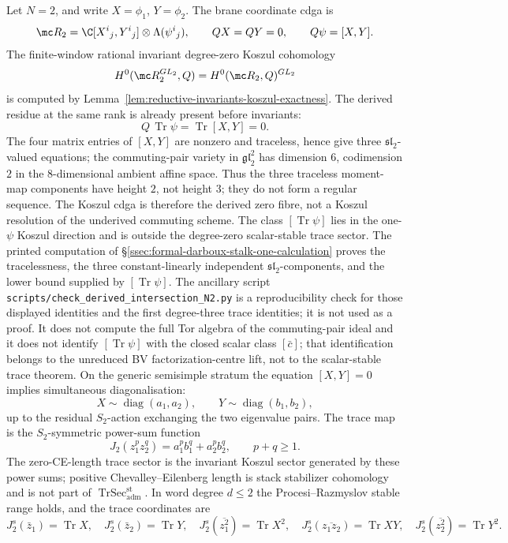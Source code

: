 \documentclass[11pt]{memoir}
\begin{document}
Let \(N=2\), and write \(X=\phi_1\), \(Y=\phi_2\).  The brane
coordinate cdga is
\[
  \mc R_2=
  \C[X^i{}_j,Y^i{}_j]\otimes\Lambda(\psi^i{}_j),
  \qquad
  QX=QY=0,\qquad Q\psi=[X,Y].
\]
The finite-window rational invariant degree-zero Koszul cohomology
\[
  H^0(\mc R_2^{GL_2},Q)
  =
  H^0(\mc R_2,Q)^{GL_2}
\]
is computed by Lemma~\ref{lem:reductive-invariants-koszul-exactness}.
The derived residue at the same rank is already present before
invariants:
\[
  Q\,\operatorname{Tr}\psi=\operatorname{Tr}[X,Y]=0.
\]
The four matrix entries of \([X,Y]\) are nonzero and traceless, hence
give three \(\mathfrak{sl}_2\)-valued equations; the commuting-pair
variety in \(\mathfrak{gl}_2^2\) has dimension \(6\), codimension
\(2\) in the \(8\)-dimensional ambient affine space.  Thus the three
traceless moment-map components have height \(2\), not height \(3\);
they do not form a regular sequence.  The Koszul cdga is therefore the
derived zero fibre, not a Koszul resolution of the underived commuting
scheme.  The class \([\operatorname{Tr}\psi]\) lies in the
one-\(\psi\) Koszul direction and is outside the degree-zero
scalar-stable trace sector.  The printed computation of
\S\ref{ssec:formal-darboux-stalk-one-calculation} proves the
tracelessness, the three constant-linearly independent
\(\mathfrak{sl}_2\)-components, and the lower bound supplied by
\([\operatorname{Tr}\psi]\).  The ancillary script
\texttt{scripts/check\_derived\_intersection\_N2.py} is a
reproducibility check for those displayed identities and the first
degree-three trace identities; it is not used as a proof.  It does not
compute the full Tor algebra of the commuting-pair ideal and it does not
identify \([\operatorname{Tr}\psi]\) with the closed scalar class
\([\bar c]\); that identification belongs to the unreduced BV
factorization-centre lift, not to the scalar-stable trace theorem.
On the generic semisimple stratum the equation \([X,Y]=0\) implies
simultaneous diagonalisation:
\[
  X\sim\operatorname{diag}(a_1,a_2),\qquad
  Y\sim\operatorname{diag}(b_1,b_2),
\]
up to the residual \(S_2\)-action exchanging the two eigenvalue pairs.
The trace map is the \(S_2\)-symmetric power-sum function
\[
  J_2(z_1^pz_2^q)=a_1^pb_1^q+a_2^pb_2^q,\qquad p+q\ge1.
\]
The zero-CE-length trace sector is the invariant Koszul sector
generated by these power sums; positive Chevalley--Eilenberg length is
stack stabilizer cohomology and is not part of
\(\operatorname{TrSec}^{\mathrm{st}}_{\mathrm{adm}}\).
In word degree \(d\leq2\) the Procesi--Razmyslov stable range holds,
and the trace coordinates are
\[
  J_2^s(\bar z_1)=\operatorname{Tr}X,\quad
  J_2^s(\bar z_2)=\operatorname{Tr}Y,\quad
  J_2^s(\overline{z_1^2})=\operatorname{Tr}X^2,\quad
  J_2^s(\overline{z_1z_2})=\operatorname{Tr}XY,\quad
  J_2^s(\overline{z_2^2})=\operatorname{Tr}Y^2.
\]
\end{document}

